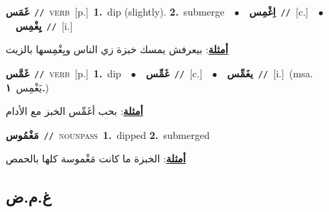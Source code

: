 \documentclass[10pt,a4paper,twoside]{article} %
\begin{document}
\begin{multicols}{2}
{\setlength\topsep{0pt}\textbf{\foreignlanguage{arabic}{غَمَس}}\ {\color{gray}\texttt{//}\color{black}}\ \textsc{verb}\ [p.]\ \textbf{1.}~dip (slightly).  \textbf{2.}~submerge\ \ $\bullet$\ \ \setlength\topsep{0pt}\textbf{\foreignlanguage{arabic}{اِغْمِس}}\ {\color{gray}\texttt{//}\color{black}}\ [c.]\ \ $\bullet$\ \ \setlength\topsep{0pt}\textbf{\foreignlanguage{arabic}{يِغْمِس}}\ {\color{gray}\texttt{//}\color{black}}\ [i.]\  \begin{flushright}\color{gray}\foreignlanguage{arabic}{\textbf{\underline{\foreignlanguage{arabic}{أمثلة}}}: بيعرفش يمسك خبزة زي الناس ويِغْمِسها بالزيت}\end{flushright}\color{black}} \vspace{2mm}

{\setlength\topsep{0pt}\textbf{\foreignlanguage{arabic}{غَمَّس}}\ {\color{gray}\texttt{//}\color{black}}\ \textsc{verb}\ [p.]\ \textbf{1.}~dip\ \ $\bullet$\ \ \setlength\topsep{0pt}\textbf{\foreignlanguage{arabic}{غَمِّس}}\ {\color{gray}\texttt{//}\color{black}}\ [c.]\ \ $\bullet$\ \ \setlength\topsep{0pt}\textbf{\foreignlanguage{arabic}{يغَمِّس}}\ {\color{gray}\texttt{//}\color{black}}\ [i.]\ \color{gray}(msa. \foreignlanguage{arabic}{يَغْمِس}~\foreignlanguage{arabic}{\textbf{١.}})\color{black}\  \begin{flushright}\color{gray}\foreignlanguage{arabic}{\textbf{\underline{\foreignlanguage{arabic}{أمثلة}}}: بحب أغَمِّس الخبز مع الأدام}\end{flushright}\color{black}} \vspace{2mm}

{\setlength\topsep{0pt}\textbf{\foreignlanguage{arabic}{مَغْمُوس}}\ {\color{gray}\texttt{//}\color{black}}\ \textsc{noun\textunderscore pass}\ \textbf{1.}~dipped  \textbf{2.}~submerged\  \begin{flushright}\color{gray}\foreignlanguage{arabic}{\textbf{\underline{\foreignlanguage{arabic}{أمثلة}}}: الخبزة ما كانت مَغْموسة كلها بالحمص}\end{flushright}\color{black}} \vspace{2mm}

\vspace{-3mm}
\subsection*{\color{blue}\foreignlanguage{arabic}{غ.م.ض}\color{blue}{}} 


\end{multicols}
\end{document}
